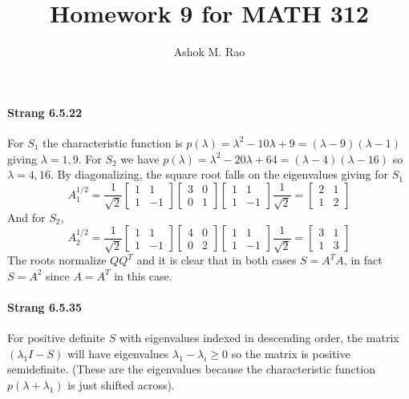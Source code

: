 \documentclass[10pt]{scrartcl}
\title{Homework 9 for MATH 312}
\author{Ashok M. Rao}
\begin{document}
\maketitle
{}

\paragraph{Strang 6.5.22} For $S_1$ the characteristic function is $p(\lambda) = \lambda^2 - 10\lambda + 9 = (\lambda-9)(\lambda-1)$ giving $\lambda=1,9$. For $S_2$ we have $p(\lambda)=\lambda^2 - 20\lambda + 64 = (\lambda-4)(\lambda-16)$ so $\lambda=4,16$. By diagonalizing, the square root falls on the eigenvalues giving for $S_1$
\[A_1^{1/2} = \frac{1}{\sqrt{2}}\begin{bmatrix}1&1\\1&-1\end{bmatrix}
				\begin{bmatrix}3&0\\0&1\end{bmatrix}
				\begin{bmatrix}1&1\\1&-1\end{bmatrix}\frac{1}{\sqrt{2}}=\begin{bmatrix}2&1\\1&2\end{bmatrix}\]
And for $S_2$,
\[A_2^{1/2} = \frac{1}{\sqrt{2}}\begin{bmatrix}1&1\\1&-1\end{bmatrix}
				\begin{bmatrix}4&0\\0&2\end{bmatrix}
				\begin{bmatrix}1&1\\1&-1\end{bmatrix}\frac{1}{\sqrt{2}}=\begin{bmatrix}3&1\\1&3\end{bmatrix}\]
The roots normalize $QQ^T$ and it is clear that in both cases $S=A^T A$, in fact $S=A^2$ since $A=A^T$ in this case.

\paragraph{Strang 6.5.35} For positive definite $S$ with eigenvalues indexed in descending order, the matrix $(\lambda_1 I - S)$ will have eigenvalues $\lambda_1 - \lambda_i \geq 0$ so the matrix is positive semidefinite. (These are the eigenvalues because the characteristic function $p(\lambda+\lambda_1)$ is just shifted across).
\end{document}
